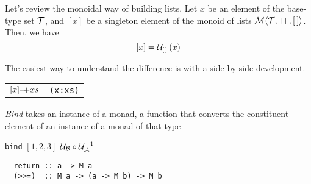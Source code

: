 Let's review the monoidal way of building lists. Let $x$ be an element of the base-type set $\mathcal{T}$, and $[x]$ be a singleton element of the monoid of lists $\Mon{\T}{\pp}{\emptylist}$. Then, we have
$$[x]=\mathcal{U}_{\mathcal{[\,]}}\left(x\right)$$


The easiest way to understand the difference is with a side-by-side development.


\begin{center}
\begin{tabular}{cc}
  $[x]\pp xs$ & \verb"(x:xs)" \\
\end{tabular}
\end{center}


\emph{Bind} takes an instance of a monad, a function that converts the constituent element of an instance of a monad of that type


\verb"bind" $[1,2,3]$ $\mathcal{U}_{\mathcal{B}}\circ{\mathcal{U}}^{-1}_{\mathcal{A}}$


\begin{verbatim}
  return :: a -> M a
  (>>=)  :: M a -> (a -> M b) -> M b
\end{verbatim}
